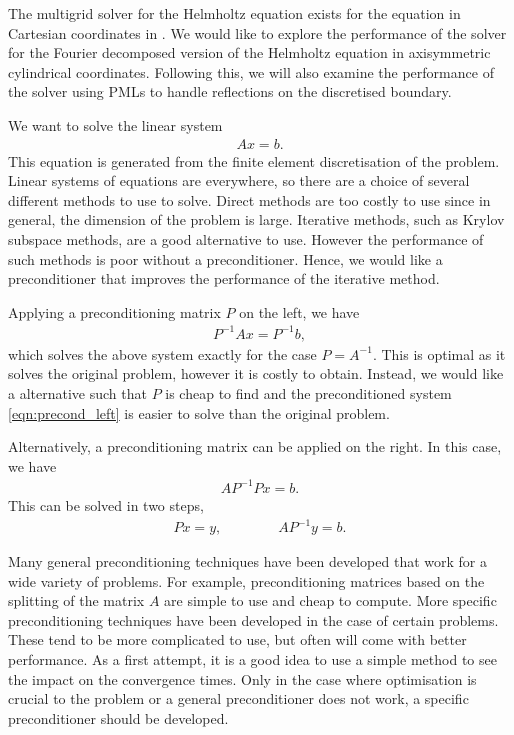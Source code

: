 The multigrid solver for the Helmholtz equation exists for the equation in Cartesian coordinates in \oomph.
We would like to explore the performance of the solver for the Fourier decomposed version of the Helmholtz equation in axisymmetric cylindrical coordinates.
Following this, we will also examine the performance of the solver using PMLs to handle reflections on the discretised boundary.


We want to solve the linear system
\begin{align}
	A x = b.
\end{align}
This equation is generated from the finite element discretisation of the problem.
Linear systems of equations are everywhere, so there are a choice of several different methods to use to solve.
Direct methods are too costly to use since in general, the dimension of the problem is large.
Iterative methods, such as Krylov subspace methods, are a good alternative to use.
However the performance of such methods is poor without a preconditioner.
Hence, we would like a preconditioner that improves the performance of the iterative method.

Applying a preconditioning matrix $P$ on the left, we have
\begin{align}
	P^{-1} A x = P^{-1} b, \label{eqn:precond_left}
\end{align}
which solves the above system exactly for the case $P=A^{-1}$. 
This is optimal as it solves the original problem, however it is costly to obtain.
Instead, we would like a alternative such that $P$ is cheap to find and the preconditioned system \eqref{eqn:precond_left} is easier to solve than the original problem.

Alternatively, a preconditioning matrix can be applied on the right.
In this case, we have
\begin{align}
	A P^{-1} P x = b. \label{eqn:precond_right}
\end{align}
This can be solved in two steps, 
\begin{align}
	P x = y, \qquad \qquad A P^{-1} y = b.
\end{align}


Many general preconditioning techniques have been developed that work for a wide variety of problems.
For example, preconditioning matrices based on the splitting of the matrix $A$ are simple to use and cheap to compute.
More specific preconditioning techniques have been developed in the case of certain problems.
These tend to be more complicated to use, but often will come with better performance.
As a first attempt, it is a good idea to use a simple method to see the impact on the convergence times.
Only in the case where optimisation is crucial to the problem or a general preconditioner does not work, a specific preconditioner should be developed.









